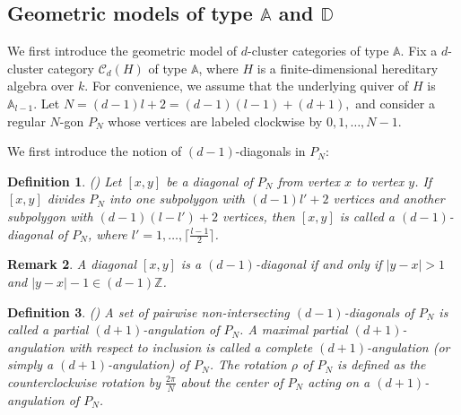 \documentclass[12pt]{article}
\theoremstyle{plain}
\newtheorem{Def}{Definition}[section]
\newtheorem{Remark}[Def]{Remark}
\theoremstyle{definition}
\begin{document}
\iffalse
\subsection{Geometric models of type $\mathbb{A}$ and $\mathbb{D}$}





We first introduce the geometric model of $d$-cluster categories of type $\mathbb{A}$. Fix a $d$-cluster category $\mathcal{C}_{d}(H)$ of type $\mathbb{A}$, where $H$ is a finite-dimensional hereditary algebra over $k$. For convenience, we assume that the underlying quiver of $H$ is $\mathbb{A}_{l-1}$. Let
\(N = (d-1)l + 2 = (d-1)(l-1) + (d+1),\)
and consider a regular $N$-gon $P_{N}$ whose vertices are labeled clockwise by $0, 1, \ldots, N-1$.

We first introduce the notion of $(d-1)$-diagonals in $P_{N}$:

\begin{Def}\textup{(\cite{DarpoIyama2020})}
Let $[x,y]$ be a diagonal of $P_{N}$ from vertex $x$ to vertex $y$. If $[x,y]$ divides $P_{N}$ into one subpolygon with $(d-1)l' + 2$ vertices and another subpolygon with $(d-1)(l-l') + 2$ vertices, then $[x,y]$ is called a $(d-1)$-diagonal of $P_{N}$, where $l' = 1, \ldots, \lceil \frac{l-1}{2} \rceil$.
\end{Def}

\begin{Remark}
A diagonal $[x,y]$ is a $(d-1)$-diagonal if and only if $|y-x| > 1$ and $|y-x|-1 \in (d-1)\mathbb{Z}$.
\end{Remark}

\begin{Def}\textup{(\cite{BaurMarsh2008})}
A set of pairwise non-intersecting $(d-1)$-diagonals of $P_{N}$ is called a partial $(d+1)$-angulation of $P_{N}$. A maximal partial $(d+1)$-angulation with respect to inclusion is called a complete $(d+1)$-angulation (or simply a $(d+1)$-angulation) of $P_{N}$. The rotation $\rho$ of $P_{N}$ is defined as the counterclockwise rotation by $\frac{2\pi}{N}$ about the center of $P_{N}$ acting on a $(d+1)$-angulation of $P_{N}$.
\end{Def}
\end{document}
